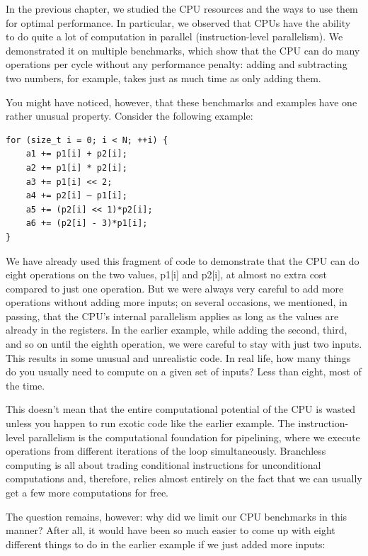 
In the previous chapter, we studied the CPU resources and the ways to use them for optimal performance. In particular, we observed that CPUs have the ability to do quite a lot of computation in parallel (instruction-level parallelism). We demonstrated it on multiple benchmarks, which show that the CPU can do many operations per cycle without any performance penalty: adding and subtracting two numbers, for example, takes just as much time as only adding them.

You might have noticed, however, that these benchmarks and examples have one rather unusual property. Consider the following example:

\begin{lstlisting}[style=styleCXX]
for (size_t i = 0; i < N; ++i) {
	a1 += p1[i] + p2[i];
	a2 += p1[i] * p2[i];
	a3 += p1[i] << 2;
	a4 += p2[i] – p1[i];
	a5 += (p2[i] << 1)*p2[i];
	a6 += (p2[i] - 3)*p1[i];
}
\end{lstlisting}

We have already used this fragment of code to demonstrate that the CPU can do eight operations on the two values, p1[i] and p2[i], at almost no extra cost compared to just one operation. But we were always very careful to add more operations without adding more inputs; on several occasions, we mentioned, in passing, that the CPU's internal parallelism applies as long as the values are already in the registers. In the earlier example, while adding the second, third, and so on until the eighth operation, we were careful to stay with just two inputs. This results in some unusual and unrealistic code. In real life, how many things do you usually need to compute on a given set of inputs? Less than eight, most of the time.

This doesn't mean that the entire computational potential of the CPU is wasted unless you happen to run exotic code like the earlier example. The instruction-level parallelism is the computational foundation for pipelining, where we execute operations from different iterations of the loop simultaneously. Branchless computing is all about trading conditional instructions for unconditional computations and, therefore, relies almost entirely on the fact that we can usually get a few more computations for free.

The question remains, however: why did we limit our CPU benchmarks in this manner? After all, it would have been so much easier to come up with eight different things to do in the earlier example if we just added more inputs:

